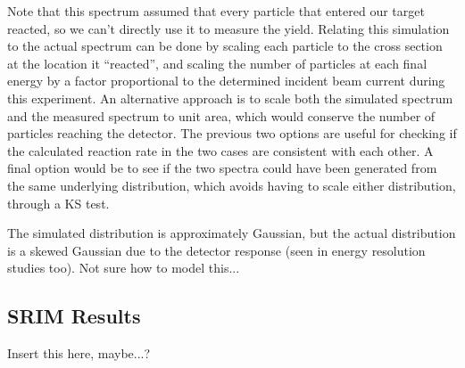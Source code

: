 Note that this spectrum assumed that every particle that entered our
target reacted, so we can't directly use it to measure the yield.
Relating this simulation to the actual spectrum can be done by scaling
each particle to the cross section at the location it ``reacted'', and
scaling the number of particles at each final energy by a factor
proportional to the determined incident beam current during this
experiment. An alternative approach is to scale both the simulated
spectrum and the measured spectrum to unit area, which would conserve
the number of particles reaching the detector. The previous two options
are useful for checking if the calculated reaction rate in the two cases
are consistent with each other. A final option would be to see if the
two spectra could have been generated from the same underlying
distribution, which avoids having to scale either distribution, through a
KS test.

The simulated distribution is approximately Gaussian, but the actual
distribution is a skewed Gaussian due to the detector response (seen in
energy resolution studies too). Not sure how to model this...


\subsection{SRIM Results}

Insert this here, maybe...?
